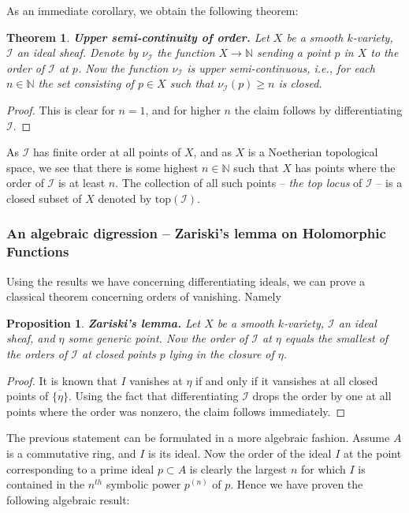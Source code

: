 \documentclass[12pt,a4paper,leqno]{article}
\newcommand{\N}{\mathbb{N}}
\theoremstyle{plain}
\newtheorem{thm}[theo]{Theorem}
\newtheorem{prop}[theo]{Proposition}
\theoremstyle{definition}
\theoremstyle{remark}
\begin{document}
As an immediate corollary, we obtain the following theorem:

\begin{thm}
\textbf{Upper semi-continuity of order.} Let $X$ be a smooth $k$-variety, $\mathscr{I}$ an ideal sheaf. Denote by $\nu_{\mathscr{I}}$ the function $X \to \N$ sending a point $p$ in $X$ to the order of $\mathscr{I}$ at $p$. Now the function $\nu_\mathscr{I}$ is upper semi-continuous, i.e., for each $n \in \N$ the set consisting of $p \in X$ such that $\nu_\mathscr{I} (p) \geq n$ is closed. 
\end{thm}
\begin{proof}
This is clear for $n=1$, and for higher $n$ the claim follows by differentiating $\mathscr{I}$.
\end{proof}

As $\mathscr I$ has finite order at all points of $X$, and as $X$ is a Noetherian topological space, we see that there is some highest $n \in \N$ such that $X$ has points where the order of $\mathscr{I}$ is at least $n$. The collection of all such points -- \emph{the top locus} of $\mathscr I$ -- is a closed subset of $X$ denoted by $\mathrm{top} (\mathscr{I})$.

\subsubsection*{An algebraic digression -- Zariski's lemma on Holomorphic Functions}

Using the results we have concerning differentiating ideals, we can prove a classical theorem concerning orders of vanishing. Namely

\begin{prop}
\textbf{Zariski's lemma.} Let $X$ be a smooth $k$-variety, $\mathscr{I}$ an ideal sheaf, and $\eta$ some generic point. Now the order of $\mathscr{I}$ at $\eta$ equals the smallest of the orders of $\mathscr{I}$ at closed points $p$ lying in the closure of $\eta$. 
\end{prop}
\begin{proof}
It is known that $I$ vanishes at $\eta$ if and only if it vansishes at all closed points of $\overline{\{\eta\}}$. Using the fact that differentiating $\mathscr{I}$ drops the order by one at all points where the order was nonzero, the claim follows immediately.
\end{proof}

The previous statement can be formulated in a more algebraic fashion. Assume $A$ is a commutative ring, and $I$ is its ideal. Now the order of the ideal $I$ at the point corresponding to a prime ideal $p \subset A$ is clearly the largest $n$ for which $I$ is contained in the $n^{th}$ symbolic power $p^{(n)}$ of $p$. Hence we have proven the following algebraic result:
\end{document}
